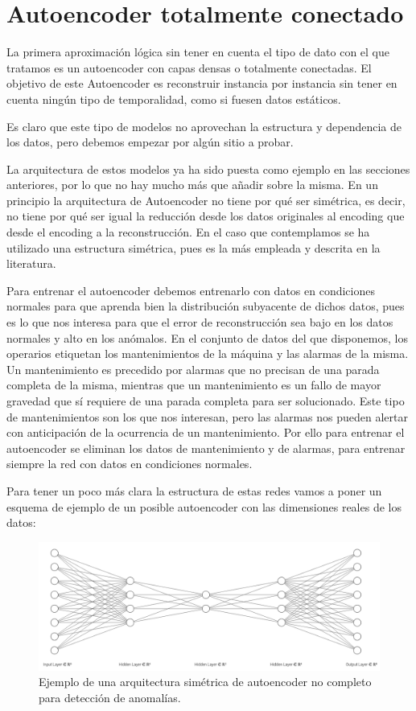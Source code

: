 \section{Autoencoder totalmente conectado}

La primera aproximación lógica sin tener en cuenta el tipo de dato con el que tratamos es un autoencoder con capas densas o totalmente conectadas. El objetivo de este Autoencoder es reconstruir instancia por instancia sin tener en cuenta ningún tipo de temporalidad, como si fuesen datos estáticos. 

Es claro que este tipo de modelos no aprovechan la estructura y dependencia de los datos, pero debemos empezar por algún sitio a probar.

La arquitectura de estos modelos ya ha sido puesta como ejemplo en las secciones anteriores, por lo que no hay mucho más que añadir sobre la misma. En un principio la arquitectura de Autoencoder no tiene por qué ser simétrica, es decir, no tiene por qué ser igual la reducción desde los datos originales al encoding que desde el encoding a la reconstrucción. En el caso que contemplamos se ha utilizado una estructura simétrica, pues es la más empleada y descrita en la literatura.

Para entrenar el autoencoder debemos entrenarlo con datos en condiciones normales para que aprenda bien la distribución subyacente de dichos datos, pues es lo que nos interesa para que el error de reconstrucción sea bajo en los datos normales y alto en los anómalos. En el conjunto de datos del que disponemos, los operarios etiquetan los mantenimientos de la máquina y las alarmas de la misma. Un mantenimiento es precedido por alarmas que no precisan de una parada completa de la misma, mientras que un mantenimiento es un fallo de mayor gravedad que sí requiere de una parada completa para ser solucionado. Este tipo de mantenimientos son los que nos interesan, pero las alarmas nos pueden alertar con anticipación de la ocurrencia de un mantenimiento. Por ello para entrenar el autoencoder se eliminan los datos de mantenimiento y de alarmas, para entrenar siempre la red con datos en condiciones normales.

Para tener un poco más clara la estructura de estas redes vamos a poner un esquema de ejemplo de un posible autoencoder con las dimensiones reales de los datos:

\begin{figure}[H]
	\centering
	\includegraphics[scale=0.35]{imagenes/autoencoder-fcc.png}
	\caption{Ejemplo de una arquitectura simétrica de autoencoder no completo para detección de anomalías.}
	\label{img:autoencoder-fcc}
\end{figure}

